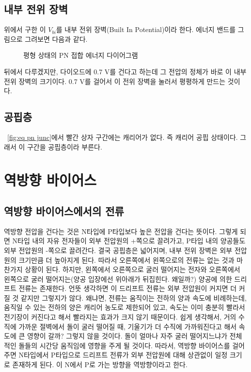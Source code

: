 \subsection{내부 전위 장벽} 위에서 구한 이 $V_{bi}$를 내부 전위 장벽(Built In Potential)이라 한다. 에너지 밴드를 그림으로 그려보면 다음과 같다.
\begin{figure}[!hbp]
    \centering
    \caption{평형 상태의 PN 접합 에너지 다이어그램}
\end{figure}
뒤에서 다루겠지만, 다이오드에 0.7 V를 건다고 하는데 그 전압의 정체가 바로 이 내부 전위 장벽의 크기이다. 0.7 V를 걸어서 이 전위 장벽을 눌러서 평평하게 만드는 것이다.
\subsection{공핍층}
\figurename~\ref{fig:eq pn junc}에서 빨간 상자 구간에는 캐리어가 없다. 즉 캐리어 공핍 상태이다. 그래서 이 구간을 공핍층이라 부른다.
\section{역방향 바이어스}
\subsection{역방향 바이어스에서의 전류}
역방향 전압을 건다는 것은 N타입에 P타입보다 높은 전압을 건다는 뜻이다. 그렇게 되면 N타입 내의 자유 전자들이 외부 전압원의 +쪽으로 끌려가고, P타입 내의 양공들도 외부 전압원의 -쪽으로 끌려간다.
결국 공핍층은 넓어지며, 내부 전위 장벽은 외부 전압원의 크기만큼 더 높아지게 된다. 따라서 오른쪽에서 왼쪽으로의 전류는 없는 것과 마찬가지 상황이 된다. 하지만, 왼쪽에서 오른쪽으로 굴러 떨어지는 전자와 오른쪽에서 왼쪽으로 굴러 떨어지는(양공 입장에선 위아래가 뒤집힌다. 왜일까?) 양공에 의한 드리프트 전류는 존재한다.
언뜻 생각하면 이 드리프트 전류는 외부 전압원이 커지면 더 커질 것 같지만 그렇지가 않다. 왜냐면, 전류는 움직이는 전하의 양과 속도에 비례하는데, 움직일 수 있는 전하의 양은 캐리어 농도로 제한되어 있고, 속도는 이미 충분히 빨라서 전기장이 커진다고 해서 빨라지는 효과가 크지 않기 때문이다.
쉽게 생각해서, 거의 수직에 가까운 절벽에서 돌이 굴러 떨어질 때, 기울기가 더 수직에 가까워진다고 해서 속도에 큰 영향이 갈까? 그렇지 않을 것이다. 돌이 얼마나 자주 굴러 떨어지느냐가 전체적인 돌들의 시간당 움직임에 영향을 주게 될 것이다.
따라서, 역방향 바이어스를 걸어 주면 N타입에서 P타입으로 드리프트 전류가 외부 전압원에 대해 상관없이 일정 크기로 존재하게 된다. 이 N에서 P로 가는 방향을 역방향이라고 한다.
